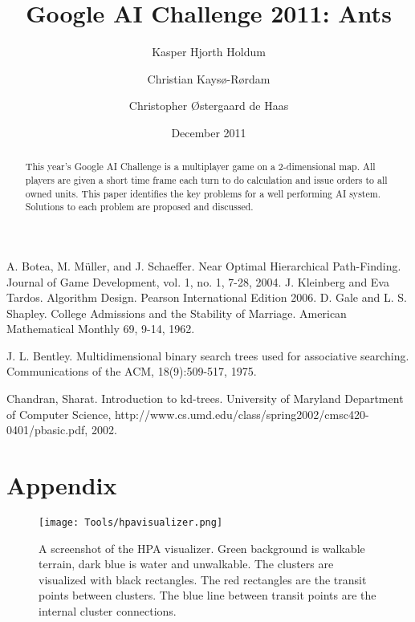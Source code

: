 \documentclass[a4paper]{llncs}
\begin{document}
\author{Kasper Hjorth Holdum \and Christian Kays{\o}-R{\o}rdam \and Christopher {\O}stergaard de Haas}


\title{Google AI Challenge 2011: Ants}

\date{December 2011}
\maketitle
\thispagestyle{plain} \pagestyle{plain}

\smallskip

\begin{abstract}
This year's Google AI Challenge is a multiplayer game on a 2-dimensional map. All players are given a short time frame each turn to do calculation and issue orders to all owned units. This paper identifies the key problems for a well performing AI system. Solutions to each problem are proposed and discussed.

\end{abstract}

\medskip









\begin{thebibliography}{1}

A. Botea, M. M\"{u}ller, and J. Schaeffer.  
\newblock Near Optimal Hierarchical Path-Finding.
\newblock Journal of Game Development, vol. 1, no. 1, 7-28, 2004.
J. Kleinberg and Eva Tardos.
\newblock Algorithm Design.
\newblock Pearson International Edition 2006.
D. Gale and L. S. Shapley.
\newblock College Admissions and the Stability of Marriage.
\newblock American Mathematical Monthly 69, 9-14, 1962.

J. L. Bentley.
\newblock Multidimensional binary search trees used for associative searching.
\newblock Communications of the ACM, 18(9):509-517, 1975.

Chandran, Sharat.
\newblock Introduction to kd-trees.
\newblock University of Maryland Department of Computer Science, http://www.cs.umd.edu/class/spring2002/cmsc420-0401/pbasic.pdf, 2002.
\end{thebibliography}
\section*{Appendix}
\begin{figure}[htb]
\centering
\texttt{[image: Tools/hpavisualizer.png]}
\caption{A screenshot of the HPA visualizer. Green background is walkable terrain, dark blue is water and unwalkable. The clusters are visualized with black rectangles. The red rectangles are the transit points between clusters. The blue line between transit points are the internal cluster connections. }
\label{fig:awesome_image}
\end{figure}
\end{document}
